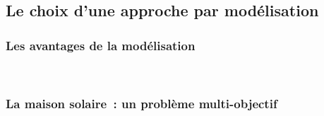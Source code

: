 



\subsection{Le choix d’une approche par modélisation} %
\label{sub:le_choix_d_une_approche_par_modelisation}
\subsubsection{Les avantages de la modélisation} %
\label{ssub:les_avantages_de_la_modelisation}
~



\subsubsection{La maison solaire~: un problème multi-objectif} %
\label{ssub:la_maison_solaire_un_probleme_multi_objectif}
~




























